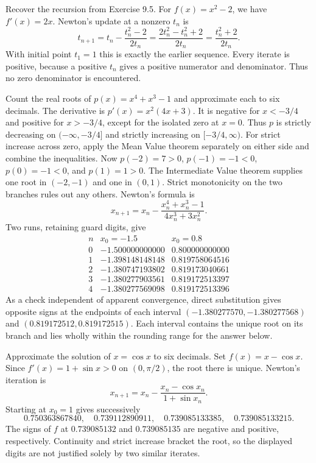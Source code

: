 \goal Recover the recursion from Exercise 9.5.
For $f(x)=x^2-2$, we have $f'(x)=2x$. Newton's update at a nonzero
$t_n$ is
\[
 t_{n+1}=t_n-\frac{t_n^2-2}{2t_n}
 =\frac{2t_n^2-t_n^2+2}{2t_n}
 =\frac{t_n^2+2}{2t_n}.
\]
With initial point $t_1=1$ this is exactly the earlier sequence.
Every iterate is positive, because a positive $t_n$ gives a positive
numerator and denominator. Thus no zero denominator is encountered.

\goal Count the real roots of $p(x)=x^4+x^3-1$ and approximate each to six decimals.
The derivative is $p'(x)=x^2(4x+3)$. It is negative for $x<-3/4$
and positive for $x>-3/4$, except for the isolated zero at $x=0$.
Thus $p$ is strictly decreasing on $(-\infty,-3/4]$ and strictly increasing
on $[-3/4,\infty)$. For strict increase across zero, apply the Mean Value
theorem separately on either side and combine the inequalities.
Now $p(-2)=7>0$, $p(-1)=-1<0$, $p(0)=-1<0$, and $p(1)=1>0$.
The Intermediate Value theorem supplies one root in $(-2,-1)$ and one
in $(0,1)$. Strict monotonicity on the two branches rules out any others.
Newton's formula is
\[
 x_{n+1}=x_n-\frac{x_n^4+x_n^3-1}{4x_n^3+3x_n^2}.
\]
Two runs, retaining guard digits, give
\[
\begin{array}{c|rr}
 n&x_0=-1.5&x_0=0.8\\\hline
 0&-1.500000000000&0.800000000000\\
 1&-1.398148148148&0.819758064516\\
 2&-1.380747193802&0.819173040661\\
 3&-1.380277903561&0.819172513397\\
 4&-1.380277569098&0.819172513396
\end{array}
\]
As a check independent of apparent convergence, direct substitution gives
opposite signs at the endpoints of each interval
$(-1.380277570,-1.380277568)$ and $(0.819172512,0.819172515)$.
Each interval contains the unique root on its branch and lies wholly
within the rounding range for the answer below.

\goal Approximate the solution of $x=\cos x$ to six decimals.
Set $f(x)=x-\cos x$. Since $f'(x)=1+\sin x>0$ on $(0,\pi/2)$,
the root there is unique. Newton's iteration is
\[
 x_{n+1}=x_n-\frac{x_n-\cos x_n}{1+\sin x_n}.
\]
Starting at $x_0=1$ gives successively
\[
 0.750363867840,\quad0.739112890911,\quad
 0.739085133385,\quad0.739085133215.
\]
The signs of $f$ at $0.739085132$ and $0.739085135$ are negative
and positive, respectively. Continuity and strict increase bracket the
root, so the displayed digits are not justified solely by two similar iterates.

